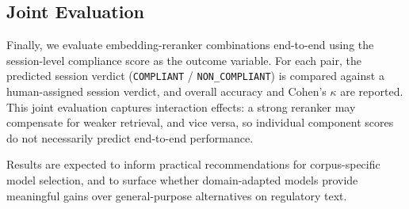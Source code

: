 \documentclass[11pt]{article}
\begin{document}
\subsection{Joint Evaluation}

Finally, we evaluate embedding-reranker combinations end-to-end using the session-level compliance score as the outcome variable. For each pair, the predicted session verdict (\texttt{COMPLIANT} / \texttt{NON\_COMPLIANT}) is compared against a human-assigned session verdict, and overall accuracy and Cohen's $\kappa$ are reported. This joint evaluation captures interaction effects: a strong reranker may compensate for weaker retrieval, and vice versa, so individual component scores do not necessarily predict end-to-end performance.

Results are expected to inform practical recommendations for corpus-specific model selection, and to surface whether domain-adapted models provide meaningful gains over general-purpose alternatives on regulatory text.



\end{document}
